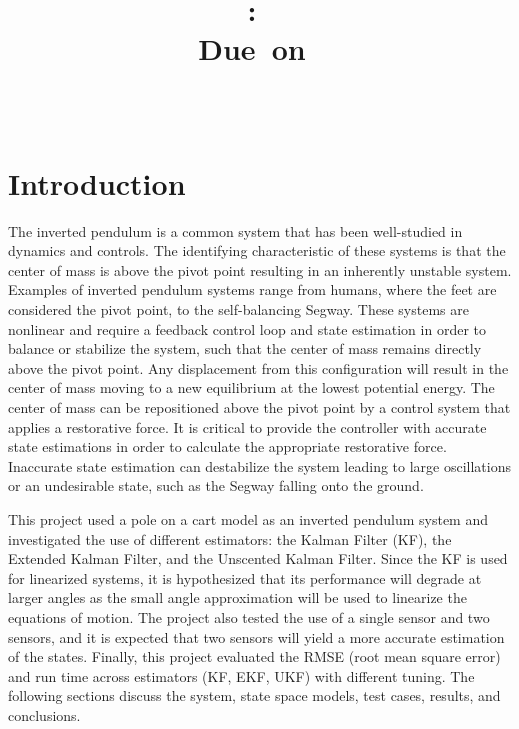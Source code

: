 \documentclass{article}
\title{
\vspace{2in}
\textmd{\textbf{\hmwkClass:\ \hmwkTitle}}\\
\normalsize\vspace{0.1in}\large{Due\ on\ \hmwkDueDate}\\
\vspace{0.1in}\large{\textit{\hmwkClassInstructor\ \hmwkClassTime}}\\
\vspace{3in}
}
\author{\textbf{\hmwkAuthorName}}
\date{} %
\begin{document}
\maketitle



\newpage
\tableofcontents
\listoffigures
\listoftables
\newpage

\section{Introduction}

 The inverted pendulum is a common system that has been well-studied in dynamics and controls.  The identifying characteristic of these systems is that the center of mass is above the pivot point resulting in an inherently unstable system.  Examples of inverted pendulum systems range from humans, where the feet are considered the pivot point, to the self-balancing Segway.  These systems are nonlinear and require a feedback control loop and state estimation in order to balance or stabilize the system, such that the center of mass remains directly above the pivot point.  Any displacement from this configuration will result in the center of mass moving to a new equilibrium at the lowest potential energy.  The center of mass can be repositioned above the pivot point by a control system that applies a restorative force.  It is critical to provide the controller with accurate state estimations in order to calculate the appropriate restorative force.  Inaccurate state estimation can destabilize the system leading to large oscillations or an undesirable state, such as the Segway falling onto the ground.

 This project used a pole on a cart model as an inverted pendulum system and investigated the use of different estimators: the Kalman Filter (KF), the Extended Kalman Filter, and the Unscented Kalman Filter.  Since the KF is used for linearized systems, it is hypothesized that its performance will degrade at larger angles as the small angle approximation will be used to linearize the equations of motion.  The project also tested the use of a single sensor and two sensors, and it is expected that two sensors will yield a more accurate estimation of the states.  Finally, this project evaluated the RMSE (root mean square error) and run time across estimators (KF, EKF, UKF) with different tuning.  The following sections discuss the system, state space models, test cases, results, and conclusions.
\end{document}
